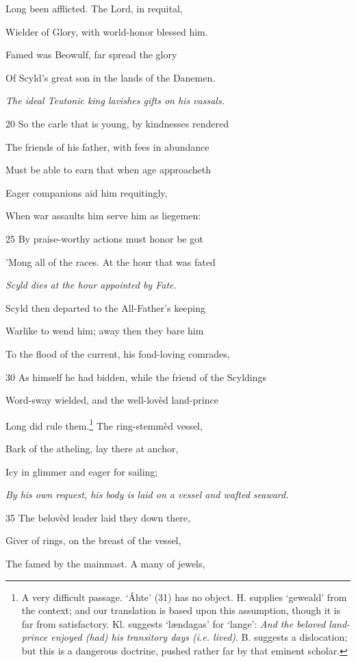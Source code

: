 Long been afflicted. The Lord, in requital,

Wielder of Glory, with world-honor blessed him.

Famed was Beowulf, far spread the glory

Of Scyld’s great son in the lands of the Danemen.

\emph{The ideal Teutonic
king lavishes gifts
on his vassals.}

20
So the carle that is young, by kindnesses rendered

The friends of his father, with fees in abundance

Must be able to earn that when age approacheth

Eager companions aid him requitingly,

When war assaults him serve him as liegemen:

25
By praise-worthy actions must honor be got

’Mong all of the races. At the hour that was fated

\emph{Scyld dies at the
hour appointed by
Fate.}

Scyld then departed to the All-Father’s keeping

Warlike to wend him; away then they bare him

To the flood of the current, his fond-loving comrades,

30
As himself he had bidden, while the friend of the Scyldings

Word-sway wielded, and the well-lovèd land-prince

Long did rule them.\footnote{A very difficult passage. ‘Áhte’ (31) has no object. H. supplies ‘geweald’
from the context; and our translation is based upon this assumption,
though it is far from satisfactory. Kl. suggests ‘lændagas’ for ‘lange’: \emph{And
the beloved land-prince enjoyed (had) his transitory days (i.e. lived)}. B. suggests
a dislocation; but this is a dangerous doctrine, pushed rather far by that
eminent scholar.} The ring-stemmèd vessel,

Bark of the atheling, lay there at anchor,

Icy in glimmer and eager for sailing;

\emph{By his own request,
his body is
laid on a vessel
and wafted seaward.}

35
The belovèd leader laid they down there,

Giver of rings, on the breast of the vessel,

The famed by the mainmast. A many of jewels,

